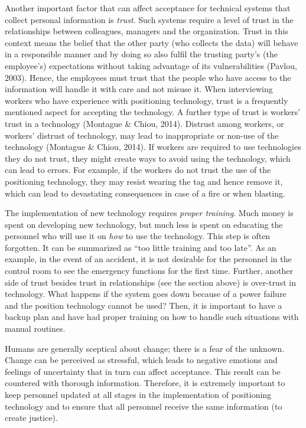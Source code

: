 \documentclass[
  12pt,
]{scrbook}
\begin{document}
Another important factor that can affect acceptance for technical systems that collect personal information is \emph{trust}. Such systems require a level of trust in the relationships between colleagues, managers and the organization. Trust in this context means the belief that the other party (who collects the data) will behave in a responsible manner and by doing so also fulfil the trusting party's (the employee's) expectations without taking advantage of its vulnerabilities (Pavlou, 2003). Hence, the employees must trust that the people who have access to the information will handle it with care and not misuse it. When interviewing workers who have experience with positioning technology, trust is a frequently mentioned aspect for accepting the technology. A further type of trust is workers' trust in a technology (Montague \& Chiou, 2014). Distrust among workers, or workers' distrust of technology, may lead to inappropriate or non-use of the technology (Montague \& Chiou, 2014). If workers are required to use technologies they do not trust, they might create ways to avoid using the technology, which can lead to errors. For example, if the workers do not trust the use of the positioning technology, they may resist wearing the tag and hence remove it, which can lead to devastating consequences in case of a fire or when blasting.

The implementation of new technology requires \emph{proper training}. Much money is spent on developing new technology, but much less is spent on educating the personnel who will use it on \emph{how} to use the technology. This step is often forgotten. It can be summarized as ``too little training and too late''. As an example, in the event of an accident, it is not desirable for the personnel in the control room to see the emergency functions for the first time. Further, another side of trust besides trust in relationships (see the section above) is over-trust in technology. What happens if the system goes down because of a power failure and the position technology cannot be used? Then, it is important to have a backup plan and have had proper training on how to handle such situations with manual routines.

Humans are generally sceptical about change; there is a fear of the unknown. Change can be perceived as stressful, which leads to negative emotions and feelings of uncertainty that in turn can affect acceptance. This result can be countered with thorough information. Therefore, it is extremely important to keep personnel updated at all stages in the implementation of positioning technology and to ensure that all personnel receive the same information (to create justice).~
\end{document}
